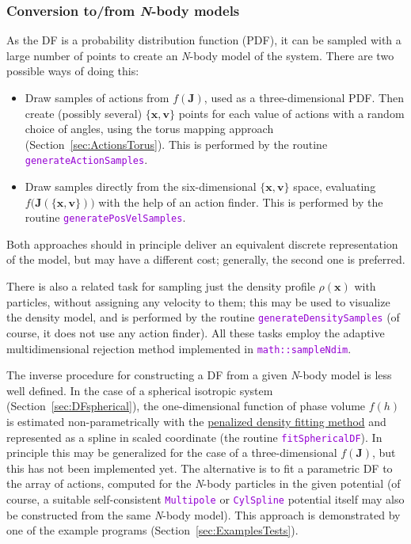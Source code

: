 \documentclass[12pt]{article}
\newcommand{\Nbody}{\textsl{N}-body\xspace}
\newcommand{\ttt}[1]{\textcolor{darkviolet}{\texttt{#1}}}
\newcommand{\bv}{\boldsymbol{v}}
\newcommand{\bx}{\boldsymbol{x}}
\newcommand{\bJ}{\boldsymbol{J}}
\begin{document}
\subsubsection{Conversion to/from \Nbody models}  \label{sec:Nbody}

As the DF is a probability distribution function (PDF), it can be sampled with a large number of points to create an \Nbody model of the system. There are two possible ways of doing this:
\begin{itemize}  \setlength{\parskip}{2pt} \setlength{\itemsep}{2pt}
\item Draw samples of actions from $f(\bJ)$, used as a three-dimensional PDF. Then create (possibly several) $\{\bx,\bv\}$ points for each value of actions with a random choice of angles, using the torus mapping approach (Section~\ref{sec:ActionsTorus}). This is performed by the routine \ttt{generateActionSamples}.
\item Draw samples directly from the six-dimensional $\{\bx,\bv\}$ space, evaluating $f\big(\bJ(\{\bx,\bv\})\big)$ with the help of an action finder. This is performed by the routine \ttt{generatePosVelSamples}.
\end{itemize}
Both approaches should in principle deliver an equivalent discrete representation of the model, but may have a different cost; generally, the second one is preferred.

There is also a related task for sampling just the density profile $\rho(\bx)$ with particles, without assigning any velocity to them; this may be used to visualize the density model, and is performed by the routine \ttt{generateDensitySamples} (of course, it does not use any action finder). All these tasks employ the adaptive multidimensional rejection method implemented in \ttt{math::sampleNdim}.

The inverse procedure for constructing a DF from a given \Nbody model is less well defined. In the case of a spherical isotropic system (Section~\ref{sec:DFspherical}), the one-dimensional function of phase volume $f(h)$ is estimated non-parametrically with the \hyperref[sec:SplineFitting]{penalized density fitting method} and represented as a spline in scaled coordinate (the routine \ttt{fitSphericalDF}). In principle this may be generalized for the case of a three-dimensional $f(\bJ)$, but this has not been implemented yet. The alternative is to fit a parametric DF to the array of actions, computed for the \Nbody particles in the given potential (of course, a suitable self-consistent \ttt{Multipole} or \ttt{CylSpline} potential itself may also be constructed from the same \Nbody model). This approach is demonstrated by one of the example programs (Section~\ref{sec:ExamplesTests}).
\end{document}
